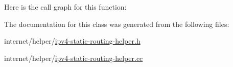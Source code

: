 Here is the call graph for this function\+:




The documentation for this class was generated from the following files\+:\begin{DoxyCompactItemize}
\item 
internet/helper/\hyperlink{ipv4-static-routing-helper_8h}{ipv4-\/static-\/routing-\/helper.\+h}\item 
internet/helper/\hyperlink{ipv4-static-routing-helper_8cc}{ipv4-\/static-\/routing-\/helper.\+cc}\end{DoxyCompactItemize}

